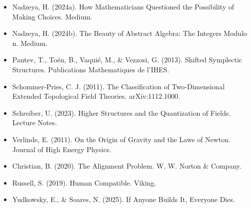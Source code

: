 \documentclass[12pt,a4paper]{article}
\theoremstyle{definition}
\theoremstyle{plain}
\begin{document}
\begin{itemize}
\item Nadzeya, H. (2024a). How Mathematicians Questioned the Possibility of Making Choices. Medium.
\item Nadzeya, H. (2024b). The Beauty of Abstract Algebra: The Integers Modulo n. Medium.
\item Pantev, T., Toën, B., Vaquié, M., \& Vezzosi, G. (2013). Shifted Symplectic Structures. Publications Mathematiques de l'IHES.
\item Schommer-Pries, C. J. (2011). The Classification of Two-Dimensional Extended Topological Field Theories. arXiv:1112.1000.
\item Schreiber, U. (2023). Higher Structures and the Quantization of Fields. Lecture Notes.
\item Verlinde, E. (2011). On the Origin of Gravity and the Laws of Newton. Journal of High Energy Physics.
\item Christian, B. (2020). The Alignment Problem. W. W. Norton \& Company.
\item Russell, S. (2019). Human Compatible. Viking.
\item Yudkowsky, E., \& Soares, N. (2025). If Anyone Builds It, Everyone Dies.
\end{itemize}
\end{document}

